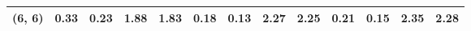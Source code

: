 \begin{tabular}{lrrrrrrrrrrrr}
(6, 6)        &                                               0.33 &                                            0.23 &                            1.88 &                                  1.83 &                                               0.18 &                                            0.13 &                            2.27 &                                  2.25 &                                               0.21 &                                            0.15 &                            2.35 &                                  2.28 \\
\bottomrule
\end{tabular}
